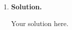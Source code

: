 \documentclass{article}
\theoremstyle{definition}
\theoremstyle{remark}
\newenvironment{Q}
        {%
          \clearpage
          \item
        }
        {%
          \phantom{s} 
          \bigskip
        }
\begin{document}
\begin{enumerate}[font={\Large\bfseries},left=0pt]
\begin{Q}
\begin{enumerate}
\end{enumerate}


\end{Q}



\textbf{Solution.}
\begin{tcolorbox}
Your solution here.
\end{tcolorbox}



\end{enumerate}
\end{document}
